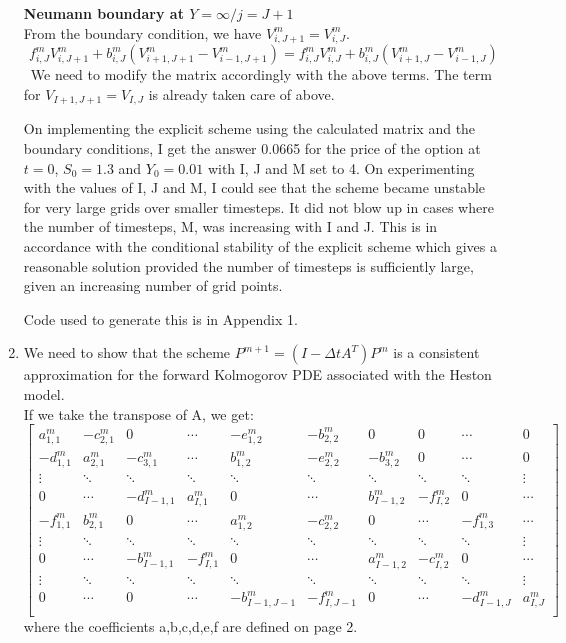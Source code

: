\documentclass{article}
\begin{document}
\begin{enumerate}
\textbf{Neumann boundary at $Y=\infty/j=J+1$}\\
From the boundary condition, we have $V^m_{i,J+1} = V^m_{i,J}$. 
\[f^m_{i,J}V^m_{i,J+1}  + b^m_{i,J}(V^m_{i+1,J+1} - V^m_{i-1,J+1}) = f^m_{i,J}V^m_{i,J}  + b^m_{i,J}(V^m_{i+1,J} - V^m_{i-1,J}) \]\
We need to modify the matrix accordingly with the above terms. The term for $V_{I+1,J+1}=V_{I,J}$ is already taken care of above. 

On implementing the explicit scheme using the calculated matrix and the boundary conditions, I get the answer 0.0665 for the price of the option at $t=0$, $S_0=1.3$ and $Y_0=0.01$ with I, J and M set to 4. On experimenting with the values of I, J and M, I could see that the scheme became unstable for very large grids over smaller timesteps. It did not blow up in cases where the number of timesteps, M, was increasing with I and J.  This is in accordance with the conditional stability of the explicit scheme which gives a reasonable solution provided the number of timesteps is sufficiently large, given an increasing number of grid points. 

Code used to generate this is in Appendix 1. 

\item We need to show that the scheme $P^{m+1} = (I-\Delta{t}A^T)P^m$ is a consistent approximation for the forward Kolmogorov PDE associated with the Heston model. \\

If we take the transpose of A, we get:
\[
\begin{bmatrix}
a^{m}_{1,1} & -c^{m}_{2,1} & 0 & \cdots &-e^{m}_{1,2}&-b^{m}_{2,2}&0&0&\cdots&0 \\
-d^m_{1,1} & a^m_{2,1} & -c^m_{3,1} & \cdots &b^m_{1,2}&-e^m_{2,2}&-b^{m}_{3,2}&0&\cdots&0 \\
\vdots & \ddots & \ddots & \ddots & \ddots&\ddots&\ddots&\ddots&\ddots&\vdots \\
0&\cdots & -d^m_{I-1,1} & a^m_{I,1} & 0&\cdots&b^m_{I-1,2}&-f^{m}_{I,2}&0&\cdots \\

-f^{m}_{1,1} & b^{m}_{2,1} & 0 & \cdots &a^{m}_{1,2}&-c^{m}_{2,2}&0&\cdots&-f^m_{1,3}&\cdots \\
\vdots & \ddots & \ddots & \ddots & \ddots&\ddots&\ddots&\ddots&\ddots&\vdots \\
0&\cdots & -b^m_{I-1,1} & -f^m_{I,1} & 0&\cdots&a^m_{I-1,2}&-c^{m}_{I,2}&0&\cdots \\
\vdots & \ddots & \ddots & \ddots & \ddots&\ddots&\ddots&\ddots&\ddots&\vdots \\
0&\cdots&0&\cdots & -b^m_{I-1,J-1} & -f^m_{I,J-1} & 0&\cdots&-d^m_{I-1,J}&a^{m}_{I,J}\\
\end{bmatrix}\
\] 
where the coefficients a,b,c,d,e,f are defined on page 2. \\


\end{enumerate}
\end{document}
